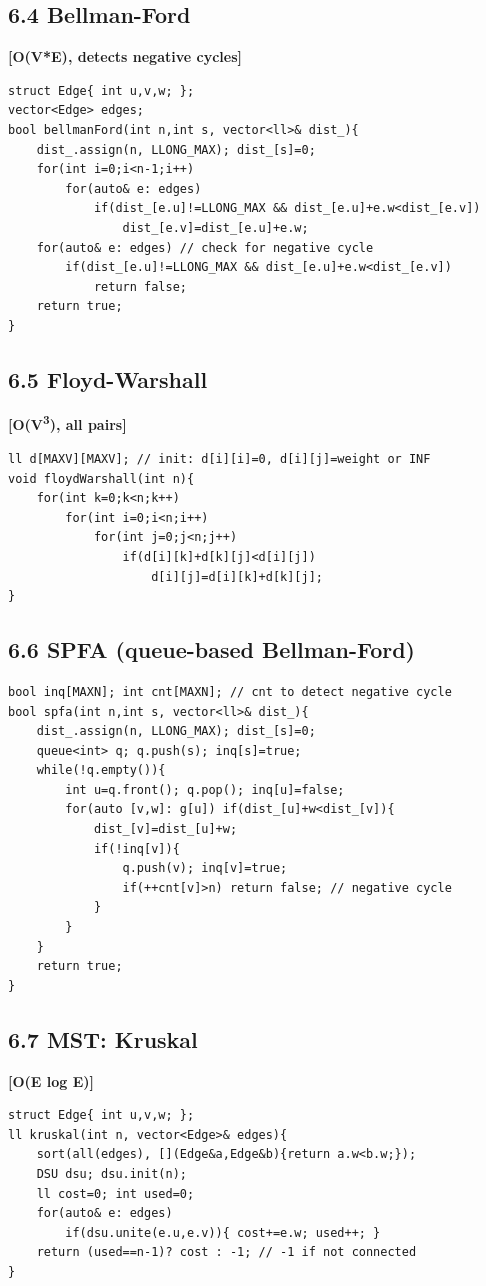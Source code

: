\documentclass[11pt]{extarticle}
\newcommand{\comp}[1]{\textbf{[#1]}\\}
\begin{document}
\subsection*{6.4 Bellman-Ford}
\comp{O(V*E), detects negative cycles}
\begin{lstlisting}
struct Edge{ int u,v,w; };
vector<Edge> edges;
bool bellmanFord(int n,int s, vector<ll>& dist_){
    dist_.assign(n, LLONG_MAX); dist_[s]=0;
    for(int i=0;i<n-1;i++)
        for(auto& e: edges)
            if(dist_[e.u]!=LLONG_MAX && dist_[e.u]+e.w<dist_[e.v])
                dist_[e.v]=dist_[e.u]+e.w;
    for(auto& e: edges) // check for negative cycle
        if(dist_[e.u]!=LLONG_MAX && dist_[e.u]+e.w<dist_[e.v])
            return false;
    return true;
}
\end{lstlisting}

\subsection*{6.5 Floyd-Warshall}
\comp{O(V\textsuperscript{3}), all pairs}
\begin{lstlisting}
ll d[MAXV][MAXV]; // init: d[i][i]=0, d[i][j]=weight or INF
void floydWarshall(int n){
    for(int k=0;k<n;k++)
        for(int i=0;i<n;i++)
            for(int j=0;j<n;j++)
                if(d[i][k]+d[k][j]<d[i][j])
                    d[i][j]=d[i][k]+d[k][j];
}
\end{lstlisting}

\subsection*{6.6 SPFA (queue-based Bellman-Ford)}
\begin{lstlisting}
bool inq[MAXN]; int cnt[MAXN]; // cnt to detect negative cycle
bool spfa(int n,int s, vector<ll>& dist_){
    dist_.assign(n, LLONG_MAX); dist_[s]=0;
    queue<int> q; q.push(s); inq[s]=true;
    while(!q.empty()){
        int u=q.front(); q.pop(); inq[u]=false;
        for(auto [v,w]: g[u]) if(dist_[u]+w<dist_[v]){
            dist_[v]=dist_[u]+w;
            if(!inq[v]){
                q.push(v); inq[v]=true;
                if(++cnt[v]>n) return false; // negative cycle
            }
        }
    }
    return true;
}
\end{lstlisting}

\subsection*{6.7 MST: Kruskal}
\comp{O(E log E)}
\begin{lstlisting}
struct Edge{ int u,v,w; };
ll kruskal(int n, vector<Edge>& edges){
    sort(all(edges), [](Edge&a,Edge&b){return a.w<b.w;});
    DSU dsu; dsu.init(n);
    ll cost=0; int used=0;
    for(auto& e: edges)
        if(dsu.unite(e.u,e.v)){ cost+=e.w; used++; }
    return (used==n-1)? cost : -1; // -1 if not connected
}
\end{lstlisting}
\end{document}
